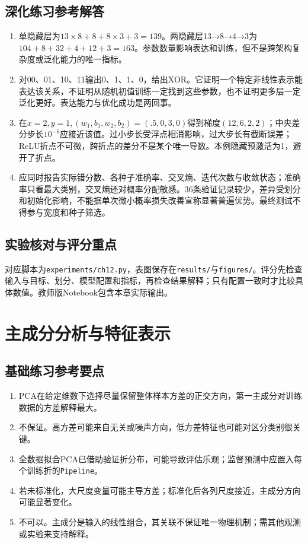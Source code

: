 \section*{深化练习参考解答}
\begin{enumerate}[label=D\arabic*.]
\item 单隐藏层为$13\times8+8+8\times3+3=139$。两隐藏层13→8→4→3为$104+8+32+4+12+3=163$。参数数量影响表达和训练，但不是跨架构复杂度或泛化能力的唯一指标。
\item 对00、01、10、11输出0、1、1、0，给出XOR。它证明一个特定非线性表示能表达该关系，不证明从随机初值训练一定找到这些参数，也不证明更多层一定泛化更好。表达能力与优化成功是两回事。
\item 在$x=2,y=1,(w_1,b_1,w_2,b_2)=(.5,0,3,0)$得到梯度$(12,6,2,2)$；中央差分步长$10^{-6}$应接近该值。过小步长受浮点相消影响，过大步长有截断误差；ReLU折点不可微，跨折点的差分不是某个唯一导数。本例隐藏预激活为1，避开了折点。
\item 应同时报告实际错分数、各种子准确率、交叉熵、迭代次数与收敛状态；准确率只看最大类别，交叉熵还对概率分配敏感。36条验证记录较少，差异受划分和初始化影响，不能据单次微小概率损失改善宣称显著普遍优势。最终测试不得参与宽度和种子筛选。
\end{enumerate}

\section*{实验核对与评分重点}
对应脚本为\texttt{experiments/ch12.py}，表图保存在\texttt{results/}与\texttt{figures/}。评分先检查输入与目标、划分、模型配置和指标，再检查结果解释；只有配置一致时才比较具体数值。教师版Notebook包含本章实际输出。

\chapter{主成分分析与特征表示}
\section*{基础练习参考要点}
\begin{enumerate}[label=\arabic*.]
\item PCA在给定维数下选择尽量保留整体样本方差的正交方向，第一主成分对训练数据的方差解释最大。
\item 不保证。高方差可能来自无关或噪声方向，低方差特征也可能对区分类别很关键。
\item 全数据拟合PCA已借助验证折分布，可能导致评估乐观；监督预测中应置入每个训练折的\texttt{Pipeline}。
\item 若未标准化，大尺度变量可能主导方差；标准化后各列尺度接近，主成分方向可能显著变化。
\item 不可以。主成分是输入的线性组合，其关联不保证唯一物理机制；需其他观测或实验来支持解释。
\end{enumerate}
